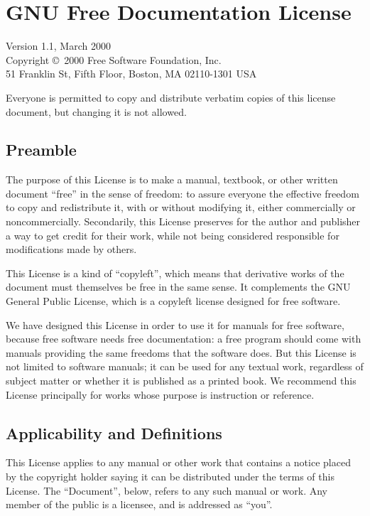 \documentclass[a4paper]{report}
\begin{document}
\chapter*{GNU Free Documentation License}

Version 1.1, March 2000\\

\noindent
 Copyright \copyright\ 2000  Free Software Foundation, Inc.\\
     51 Franklin St, Fifth Floor, Boston, MA 02110-1301  USA

\noindent
 Everyone is permitted to copy and distribute verbatim copies
 of this license document, but changing it is not allowed.


\section*{Preamble}

The purpose of this License is to make a manual, textbook, or other
written document ``free'' in the sense of freedom: to assure everyone
the effective freedom to copy and redistribute it, with or without
modifying it, either commercially or noncommercially.  Secondarily,
this License preserves for the author and publisher a way to get
credit for their work, while not being considered responsible for
modifications made by others.

This License is a kind of ``copyleft'', which means that derivative
works of the document must themselves be free in the same sense.  It
complements the GNU General Public License, which is a copyleft
license designed for free software.

We have designed this License in order to use it for manuals for free
software, because free software needs free documentation: a free
program should come with manuals providing the same freedoms that the
software does.  But this License is not limited to software manuals;
it can be used for any textual work, regardless of subject matter or
whether it is published as a printed book.  We recommend this License
principally for works whose purpose is instruction or reference.

\section*{Applicability and Definitions}

This License applies to any manual or other work that contains a
notice placed by the copyright holder saying it can be distributed
under the terms of this License.  The ``Document'', below, refers to any
such manual or work.  Any member of the public is a licensee, and is
addressed as ``you''.
\end{document}
